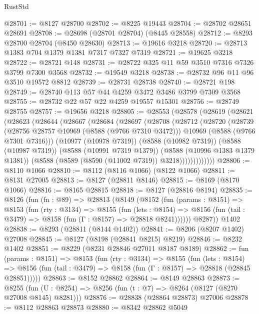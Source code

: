 \begin{lexlean}{RustStd}
\begin{coremodule}
@28701 := @8127 @28700
@28702 := @8225 @19443
@28704 := @28702 @28651 @28691
@28708 := @28698 (@28701 @28704) (@8445 @28558)
@28712 := @8293 @28700 @28704 (@8450 @28630)
@28713 := @19616 @3218
@28720 := @28713 @1383 @704 @1379 @1381 @7317 @7327 @7319
@28721 := @19625 @3218
@28722 := @28721 @148
@28731 := @28722 @325 @11 @59 @3510 @7316 @7326 @3799 @7300 @3568
@28732 := @19549 @3218
@28738 := @28732 @96 @11 @96 @3510 @19572 @8812
@28739 := @28731 @28738
@28740 := @28721 @198
@28749 := @28740 @113 @57 @44 @4259 @3472 @3486 @3799 @7309 @3568
@28755 := @28732 @22 @57 @22 @4259 @19557 @15301
@28756 := @28749 @28755
@28757 := @19656 @3218
@28805 := @28553
    (@28578
      (@28619
        (@28621
          (@28623
            (@28644
              (@28667
                (@28684
                  (@28697
                    (@28708
                      (@28712
                        (@28720
                          (@28739
                            (@28756 @28757 @10969 (@8588 (@9766 @7310 @3472)))
                            @10969
                            (@8588 (@9766 @7301 @7316)))
                          (@10977 (@10978 @7319))
                          (@8588 (@10982 @7319))
                          (@8588 (@10987 @7319))
                          (@8588 (@10991 @7319 @1379))
                          (@8588 (@10996 @1383 @1379 @1381))
                          (@8588 (@8589 (@8590 (@11002 @7319)) @3218)))))))))))))
@28806 := @8110 @1066
@28810 := @8112 (@8116 @1066) (@8122 @1066)
@28811 := @8131 @27005
@28813 := @8127 (@28811 @8146)
@28815 := @8169 (@8170 @1066)
@28816 := @8165 @28815
@28818 := @8127 (@28816 @8194)
@28835 := @8126
    (fun (fn : @89) =>
    @28813
      (@8149
        (@8152
          (fun (params : @8151) =>
          @8153
            (fun (rty : @3134) =>
            @8155
              (fun (lets : @8154) =>
              @8156 (fun (tail : @3479) => @8158 (fun (Γ : @8157) => @28818 @8241))))))
        @8287))
    @1402
@28838 := @8293 (@28811 (@8144 @1402))
@28841 := @8206 (@8207 @1402) @27008
@28845 := @8127 (@8198 (@28841 @8215) @8219)
@28846 := @8232 @1402
@28851 := @8229 (@8231 @28846 @27011 @8187 @8189)
@28862 := fun (params : @8151) =>
  @8153
    (fun (rty : @3134) =>
    @8155
      (fun (lets : @8154) =>
      @8156 (fun (tail : @3479) => @8158 (fun (Γ : @8157) => @28818 (@28845 @28851)))))
@28863 := @8152 @28862
@28864 := @8149 @28863
@28873 := @8255
    (fun (U : @8254) => @8256 (fun (t : @7) => @8264 (@8127 (@8270 @27008 @8145) @8281)))
@28876 := @28838 (@28864 @28873) @27006
@28878 := @8112 @28863 @28873
@28880 := @8342 @28862 @5049

\end{coremodule}
\end{lexlean}
